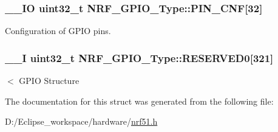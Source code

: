 \subsubsection[{P\+I\+N\+\_\+\+C\+N\+F}]{\setlength{\rightskip}{0pt plus 5cm}\+\_\+\+\_\+\+I\+O uint32\+\_\+t N\+R\+F\+\_\+\+G\+P\+I\+O\+\_\+\+Type\+::\+P\+I\+N\+\_\+\+C\+N\+F\mbox{[}32\mbox{]}}\label{struct_n_r_f___g_p_i_o___type_adf74f3058a3a9dfcb2bd856a16ee70f7}
Configuration of G\+P\+I\+O pins. \hypertarget{struct_n_r_f___g_p_i_o___type_a8c5c2e391ae90c37969c01a40960363e}{}
\subsubsection[{R\+E\+S\+E\+R\+V\+E\+D0}]{\setlength{\rightskip}{0pt plus 5cm}\+\_\+\+\_\+\+I uint32\+\_\+t N\+R\+F\+\_\+\+G\+P\+I\+O\+\_\+\+Type\+::\+R\+E\+S\+E\+R\+V\+E\+D0\mbox{[}321\mbox{]}}\label{struct_n_r_f___g_p_i_o___type_a8c5c2e391ae90c37969c01a40960363e}
$<$ G\+P\+I\+O Structure 

The documentation for this struct was generated from the following file\+:\begin{DoxyCompactItemize}
\item 
D\+:/\+Eclipse\+\_\+workspace/hardware/\hyperlink{nrf51_8h}{nrf51.\+h}\end{DoxyCompactItemize}
